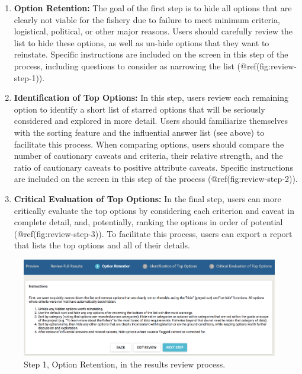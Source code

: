 \documentclass[11pt,]{book}
\providecommand{\tightlist}{%
  \setlength{\itemsep}{0pt}\setlength{\parskip}{0pt}}
\begin{document}
\begin{enumerate}
\def\labelenumi{\arabic{enumi}.}
\tightlist
\item
  \textbf{Option Retention:} The goal of the first step is to hide all
  options that are clearly not viable for the fishery due to failure to
  meet minimum criteria, logistical, political, or other major reasons.
  Users should carefully review the list to hide these options, as well
  as un-hide options that they want to reinstate. Specific instructions
  are included on the screen in this step of the process, including
  questions to consider as narrowing the list (@ref(fig:review-step-1)).
\item
  \textbf{Identification of Top Options:} In this step, users review
  each remaining option to identify a short list of starred options that
  will be seriously considered and explored in more detail. Users should
  familiarize themselves with the sorting feature and the influential
  answer list (see above) to facilitate this process. When comparing
  options, users should compare the number of cautionary caveats and
  criteria, their relative strength, and the ratio of cautionary caveats
  to positive attribute caveats. Specific instructions are included on
  the screen in this step of the process (@ref(fig:review-step-2)).
\item
  \textbf{Critical Evaluation of Top Options:} In the final step, users
  can more critically evaluate the top options by considering each
  criterion and caveat in complete detail, and, potentially, ranking the
  options in order of potential (@ref(fig:review-step-3)). To facilitate
  this process, users can export a report that lists the top options and
  all of their details.
\end{enumerate}

\begin{figure}

{\centering \includegraphics[width=0.95\linewidth]{images/review-step-1} 

}

\caption{Step 1, Option Retention, in the results review process.}\label{fig:review-step-1}
\end{figure}
\end{document}
